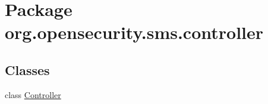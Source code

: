 \hypertarget{a00034}{\section{Package org.\+opensecurity.\+sms.\+controller}
\label{a00034}
}
\subsection*{Classes}
\begin{DoxyCompactItemize}
\item 
class \hyperlink{a00006}{Controller}
\end{DoxyCompactItemize}
